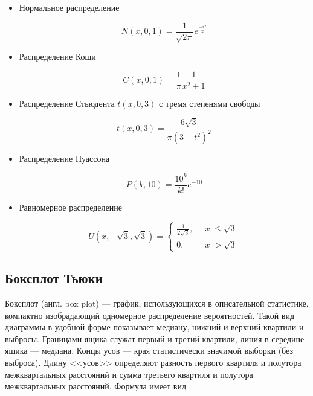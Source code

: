 \documentclass[12pt,a4paper]{article}
\begin{document}
	\begin{itemize}
		\item Нормальное распределение

		\begin{equation} \label{eq:normal}
			N(x, 0, 1) = \frac{1}{\sqrt{2\pi}}e^\frac{-x^2}{2}
		\end{equation}

		\item Распределение Коши

		\begin{equation} \label{eq:cauchy}
			C(x, 0, 1) = \frac{1}{\pi}\frac{1}{x^2+1}
		\end{equation}

		\item Распределение Стьюдента $t(x, 0, 3)$ с тремя степенями свободы

		\begin{equation} \label{eq:student}
			t(x, 0, 3) = \frac{6\sqrt3}{\pi(3 + t^2)^2}
		\end{equation}

		\item Распределение Пуассона

		\begin{equation} \label{eq:poisson}
			P(k, 10) = \frac{10^k}{k!}e^{-10}
		\end{equation}

		\item Равномерное распределение

		\begin{equation} \label{eq:uniform}
			U(x, -\sqrt3, \sqrt3) = \begin{cases}
				\frac{1}{2\sqrt3}, & \; |x| \leq \sqrt3\\
				0, & \; |x| > \sqrt3
			\end{cases}
		\end{equation}
	\end{itemize}

	\subsection{Боксплот Тьюки}

	Боксплот (англ. box plot) — график, использующихся в описательной статистике, компактно изобрадающий одномерное распределение вероятностей. Такой вид диаграммы в удобной форме показывает медиану, нижний и верхний квартили и выбросы. Границами ящика служат первый и третий квартили, линия в середине ящика — медиана. Концы усов — края статистически значимой выборки (без выброса). Длину <<усов>> определяют разность первого квартиля и полутора межквартальных расстояний и сумма третьего квартиля и полутора межквартальных расстояний. Формула имеет вид
\end{document}

